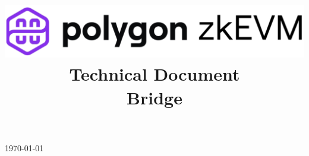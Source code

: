 \documentclass[preprint]{iacrtrans}
\title{
	\includegraphics[width=\columnwidth]{logo_zkEVM.png} \\ \vspace{0.3cm}
  Technical Document\\ \vspace{0.3cm}	
	Bridge \\
  \version
}
\institute{}
\theoremstyle{definition}
\begin{document}
\begin{titlepage}
\centering
\maketitle
\today
\end{titlepage}


{\hypersetup{linkcolor=.}\tableofcontents}

\newpage

\end{document}
